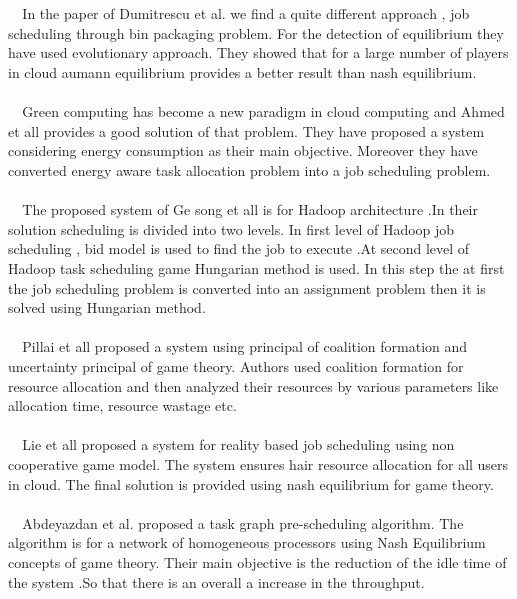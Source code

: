 \documentclass[10pt]{report}
\begin{document}
\verb|  |In the paper of Dumitrescu et al. we find a quite different  approach , job scheduling through bin packaging problem. For the detection of equilibrium  they have used evolutionary approach. They showed that for a large number of players in cloud aumann equilibrium provides a better result than nash equilibrium.\cite{Dumitrescu}\\\\
\verb|  |Green computing has become a new paradigm in cloud computing and Ahmed et all provides a good solution of that problem. They  have proposed a system considering energy  consumption as their main objective. Moreover they have converted energy aware task allocation problem into a job scheduling problem.\cite{Ahmed}\\\\
\verb|  |The proposed system of Ge song et all is for Hadoop architecture .In their solution scheduling is divided into two levels. In first level of Hadoop job scheduling , bid model is used to find the job  to execute .At second level of Hadoop task scheduling game Hungarian method is used. In this step the at first the job scheduling problem is converted into an assignment problem then it is solved using Hungarian method.\cite{Ge}\\\\
\verb|  |Pillai et all proposed a system using principal of coalition formation and uncertainty principal of  game theory. Authors used coalition formation for resource allocation  and then analyzed their resources by various parameters like allocation time, resource wastage etc.\cite{Pillai}\\\\
\verb|  |Lie et all proposed a system  for reality based job scheduling using non cooperative game model. The system ensures hair resource allocation for all users in cloud. The final solution is provided using nash equilibrium for game theory.\cite{Li}\\\\
\verb|  |Abdeyazdan et al. proposed a task graph pre-scheduling algorithm. The algorithm is  for a network of homogeneous processors using Nash Equilibrium concepts of game theory. Their main objective is  the reduction of the idle time of the system .So that there is an overall a increase in the throughput.\cite{Abdeyazdan}\\\\
\end{document}
